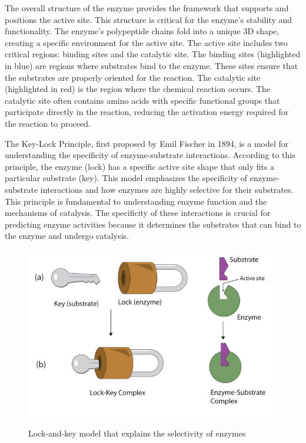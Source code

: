 The overall structure of the enzyme provides the framework that supports and positions the active site. This structure is critical for the enzyme's stability and functionality. The enzyme's polypeptide chains fold into a unique 3D shape, creating a specific environment for the active site.
The active site includes two critical regions: binding sites and the catalytic site. The binding sites (highlighted in blue) are regions where substrates bind to the enzyme. These sites ensure that the substrates are properly oriented for the reaction. The catalytic site (highlighted in red) is the region where the chemical reaction occurs. The catalytic site often contains amino acids with specific functional groups that participate directly in the reaction, reducing the activation energy required for the reaction to proceed.

The Key-Lock Principle, first proposed by Emil Fischer in 1894, is a model for understanding the specificity of enzyme-substrate interactions. According to this principle, the enzyme (lock) has a specific active site shape that only fits a particular substrate (key). This model emphasizes the specificity of enzyme-substrate interactions and how enzymes are highly selective for their substrates. This principle is fundamental to understanding enzyme function and the mechanisms of catalysis. The specificity of these interactions is crucial for predicting enzyme activities because it determines the substrates that can bind to the enzyme and undergo catalysis.

\begin{figure}[hbt]
    \centering
    \begin{minipage}[t]{.8\textwidth}
    \caption{Lock-and-key model that explains the selectivity of enzymes}
    \includegraphics[width=1\textwidth]{img/key_lock_principle.png}\\
    \label{fig:LockKeyPrinciple}
    \end{minipage}
\end{figure}

